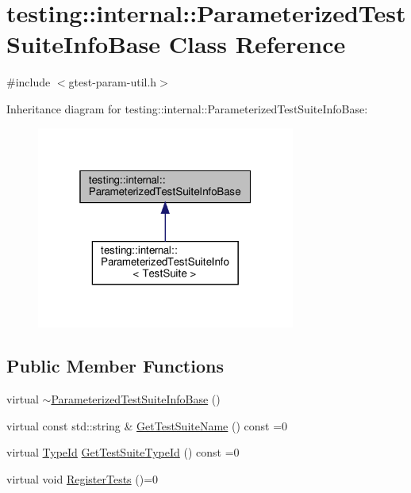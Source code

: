 \hypertarget{classtesting_1_1internal_1_1ParameterizedTestSuiteInfoBase}{}\section{testing\+:\+:internal\+:\+:Parameterized\+Test\+Suite\+Info\+Base Class Reference}
\label{classtesting_1_1internal_1_1ParameterizedTestSuiteInfoBase}


{\ttfamily \#include $<$gtest-\/param-\/util.\+h$>$}



Inheritance diagram for testing\+:\+:internal\+:\+:Parameterized\+Test\+Suite\+Info\+Base\+:\nopagebreak
\begin{figure}[H]
\begin{center}
\leavevmode
\includegraphics[width=241pt]{classtesting_1_1internal_1_1ParameterizedTestSuiteInfoBase__inherit__graph}
\end{center}
\end{figure}
\subsection*{Public Member Functions}
\begin{DoxyCompactItemize}
\item 
virtual \hyperlink{classtesting_1_1internal_1_1ParameterizedTestSuiteInfoBase_ac2aa0664f56e84cacab823d345c7d67b}{$\sim$\+Parameterized\+Test\+Suite\+Info\+Base} ()
\item 
virtual const std\+::string \& \hyperlink{classtesting_1_1internal_1_1ParameterizedTestSuiteInfoBase_aa6e36241431dc72c251ecee9b637b4d3}{Get\+Test\+Suite\+Name} () const =0
\item 
virtual \hyperlink{namespacetesting_1_1internal_ab1114197d3c657d8b7f8e0c5caa12d00}{Type\+Id} \hyperlink{classtesting_1_1internal_1_1ParameterizedTestSuiteInfoBase_ac5bcbf8c50a44472d697e0c80b54387d}{Get\+Test\+Suite\+Type\+Id} () const =0
\item 
virtual void \hyperlink{classtesting_1_1internal_1_1ParameterizedTestSuiteInfoBase_a41d7d663014af0c1e614c5a61293cb5a}{Register\+Tests} ()=0
\end{DoxyCompactItemize}
